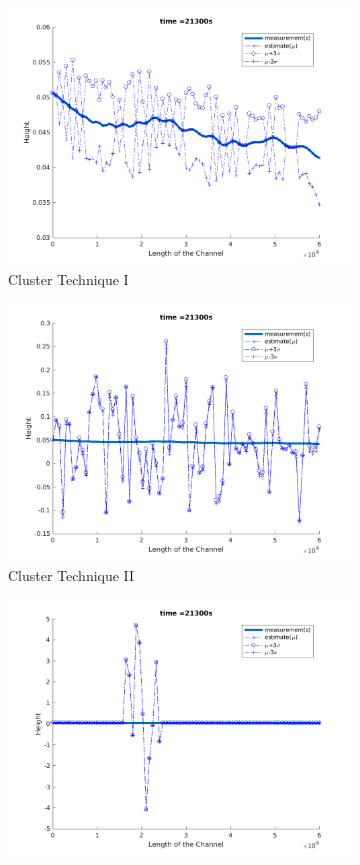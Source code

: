 \begin{figure}[H]
\begin{subfigure}[b]{0.3\textwidth}
\includegraphics[width=\textwidth]{figures_2/fig171}
\caption{Cluster Technique I}
\end{subfigure}   
\begin{subfigure}[b]{0.3\textwidth}
\centering
\includegraphics[width=\textwidth]{figures_2/fig271}
\caption{Cluster Technique II}
\end{subfigure}   
\begin{subfigure}[b]{0.3\textwidth}
\centering
\includegraphics[width=\textwidth]{figures_2/fig371}

\end{subfigure}
\end{figure}
